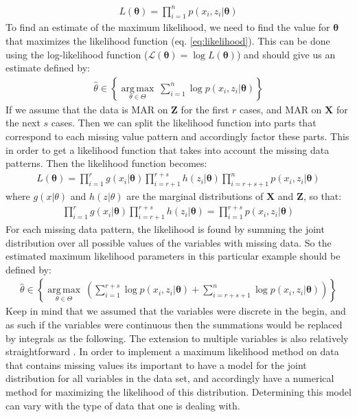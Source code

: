 \documentclass[../thesis.tex]{subfiles}
\begin{document}
\begin{align}
    L(\boldsymbol{\theta}) = \prod_{i=1}^n p(x_i, z_i | \boldsymbol{\theta})
    \label{eq:likelihood}
\end{align}
\noindent To find an estimate of the maximum likelihood, we need to find the value for $\boldsymbol{\theta}$ that maximizes the likelihood function (eq. \ref{eq:likelihood}). This can be done using the log-likelihood function ($\mathcal{L} (\boldsymbol{\theta}) = \log L(\boldsymbol{\theta})$) and should give us an estimate defined by:
\begin{align}
    {\displaystyle {\hat {\theta }}\in \left \{{\underset {\theta \in \Theta }{\operatorname {arg\,max} }}\ \sum_{i=1}^n\log p (x_i, z_i | \boldsymbol{\theta})\right \}}
\end{align}
\noindent If we assume that the data is MAR on $\boldsymbol{Z}$ for the first $r$ cases, and MAR on $\boldsymbol{X}$ for the next $s$ cases. Then we can split the likelihood function into parts that correspond to each missing value pattern and accordingly factor these parts. This in order to get a likelihood function that takes into account the missing data patterns. Then the likelihood function becomes:
\begin{align}
    L(\boldsymbol{\theta}) = \prod_{i=1}^r g(x_i | \boldsymbol{\theta})\prod_{i=r+1}^{r+s} h(z_i | \boldsymbol{\theta})\prod_{i=r+s+1}^n p(x_i, z_i | \boldsymbol{\theta}) 
\end{align}
\noindent where $g(x | \theta)$ and $h(z | \theta)$ are the marginal distributions of $\boldsymbol{X}$ and $\boldsymbol{Z}$, so that:
\begin{align}
    \prod_{i = 1}^r g(x_i | \boldsymbol{\theta}) \prod_{i = r + 1}^{r + s} h(z_i | \boldsymbol{\theta}) = \prod_{i=1}^{r+s} p(x_i, z_i | \boldsymbol{\theta})
\end{align}
\noindent For each missing data pattern, the likelihood is found by summing the joint distribution over all possible values of the variables with missing data. So the estimated maximum likelihood parameters in this particular example should be defined by:
\begin{align}
    {\displaystyle {\hat {\theta }}\in \left \{{\underset {\theta \in \Theta }{\operatorname {arg\,max} }}\ \left(\sum_{i=1}^{r+s}\log p(x_i, z_i | \boldsymbol{\theta}) + \sum_{i=r+s+1}^n\log p (x_i, z_i | \boldsymbol{\theta})\right)  \right\}}
\end{align}
\noindent Keep in mind that we assumed that the variables were discrete in the begin, and as such if the variables were continuous then the summations would be replaced by integrals as the following. The extension to multiple variables is also relatively straightforward \citep{allison1999missing}. In order to implement a maximum likelihood method on data that contains missing values its important to have a model for the joint distribution for all variables in the data set, and accordingly have a numerical method for maximizing the likelihood of this distribution. Determining this model can vary with the type of data that one is dealing with.\\
\end{document}
